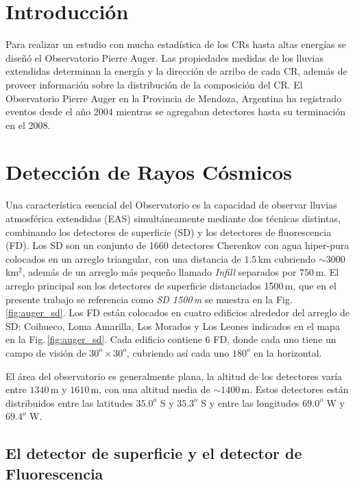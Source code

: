 

\section{Introducción}

Para realizar un estudio con mucha estadística de los CRs hasta altas energías se diseñó el Observatorio Pierre Auger. Las propiedades medidas de los lluvias extendidas determinan la energía y la dirección de arribo de cada CR, además de proveer información sobre la distribución de la composición del CR. El Observatorio Pierre Auger en la Provincia de Mendoza, Argentina ha registrado eventos desde el año 2004 mientras se agregaban detectores hasta su terminación en el 2008.

\section{Detección de Rayos Cósmicos}

Una característica esencial del Observatorio es la capacidad de observar lluvias atmosférica extendidas (EAS) simultáneamente mediante dos técnicas distintas, combinando los detectores de superficie (SD) y los detectores de fluorescencia (FD). Los SD son un conjunto de 1660  detectores Cherenkov con agua hiper-pura colocados en un arreglo triangular, con una distancia de $1.5\,$km cubriendo $\sim3000\,$km$^2$, además de un arreglo más pequeño llamado \emph{Infill} separados por $750\,$m. El arreglo principal son los detectores de superficie distanciados 1500\,m, que en el presente trabajo se  referencia como \emph{SD 1500\,m} se muestra en la Fig.\,\ref{fig:auger_sd}. Los FD están colocados en cuatro edificios alrededor del arreglo de SD: Coihueco, Loma Amarilla, Los Morados y Los Leones indicados en el mapa en la Fig.\,\ref{fig:auger_sd}. Cada edificio contiene 6 FD, donde cada uno tiene un campo de visión de $30^o\times30^o$, cubriendo así cada uno $180^o$ en la horizontal.

El área del observatorio es generalmente plana, la altitud de los detectores varía entre $1340\,$m y $1610\,$m, con una altitud media de $\sim1400\,$m. Estos detectores están distribuidos entre las latitudes $35.0^o$ S y $35.3^o$ S y entre las longitudes $69.0^o$ W y $69.4^o$ W.


\subsection{ El detector de superficie y el detector de Fluorescencia}

